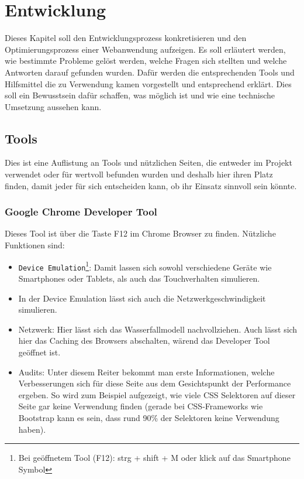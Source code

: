 \section{Entwicklung} %
\label{sec:entwicklung}
	Dieses Kapitel soll den Entwicklungsprozess konkretisieren und den Optimierungsprozess einer Webanwendung aufzeigen. Es soll erläutert werden, wie bestimmte Probleme gelöst werden, welche Fragen sich stellten und welche Antworten darauf gefunden wurden. Dafür werden die entsprechenden Tools und Hilfsmittel die zu Verwendung kamen vorgestellt und entsprechend erklärt. Dies soll ein Bewusstsein dafür schaffen, was möglich ist und wie eine technische Umsetzung aussehen kann.
	
	\subsection{Tools}
	\label{sub:tools}
		Dies ist eine Auflistung an Tools und nützlichen Seiten, die entweder im Projekt verwendet oder für wertvoll befunden wurden und deshalb hier ihren Platz finden, damit jeder für sich entscheiden kann, ob ihr Einsatz sinnvoll sein könnte.

		\subsubsection{Google Chrome Developer Tool} %
		\label{ssub:google_chrome_developertool}
			Dieses Tool ist über die Taste F12 im Chrome Browser zu finden. Nützliche Funktionen sind: 

			\begin{itemize}
				\item \texttt{Device Emulation}\footnote{Bei geöffnetem Tool (F12): strg + shift + M oder klick auf das Smartphone Symbol}: Damit lassen sich sowohl verschiedene Geräte wie Smartphones oder Tablets, als auch das Touchverhalten simulieren.

				\item In der Device Emulation lässt sich auch die Netzwerkgeschwindigkeit simulieren.

				\item Netzwerk: Hier lässt sich das Wasserfallmodell nachvollziehen. Auch lässt sich hier das Caching des Browsers abschalten, wärend das Developer Tool geöffnet ist.

				\item Audits: Unter diesem Reiter bekommt man erste Informationen, welche Verbesserungen sich für diese Seite aus dem Gesichtspunkt der Performance ergeben. So wird zum Beispiel aufgezeigt, wie viele CSS Selektoren auf dieser Seite gar keine Verwendung finden (gerade bei CSS-Frameworks wie Bootstrap kann es sein, dass rund 90\% der Selektoren keine Verwendung haben).
			\end{itemize}

